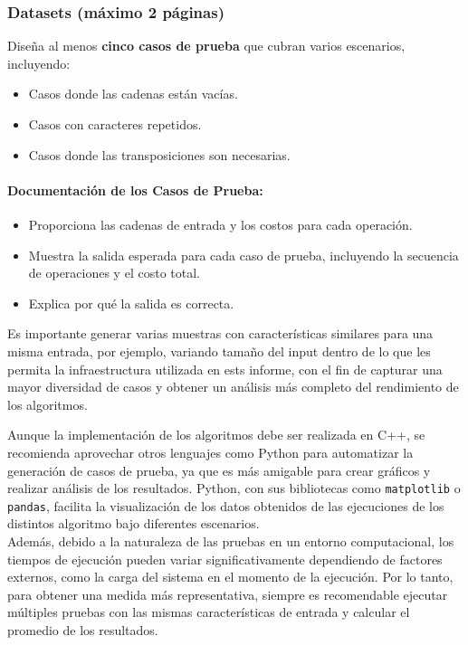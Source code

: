 \subsubsection{Datasets (máximo 2 páginas)}

Diseña al menos \textbf{cinco casos de prueba} que cubran varios escenarios, incluyendo:
\begin{itemize}
    \item Casos donde las cadenas están vacías.
    \item Casos con caracteres repetidos.
    \item Casos donde las transposiciones son necesarias.
\end{itemize}

\paragraph{Documentación de los Casos de Prueba:}
\begin{itemize}
    \item Proporciona las cadenas de entrada y los costos para cada operación.
    \item Muestra la salida esperada para cada caso de prueba, incluyendo la secuencia de operaciones y el costo total.
    \item Explica por qué la salida es correcta.
\end{itemize}

Es importante generar varias muestras con características similares para una misma entrada, por ejemplo, variando tamaño del input dentro de lo que les permita la infraestructura utilizada en ests informe, con el fin de capturar una mayor diversidad de casos y obtener un análisis más completo del rendimiento de los algoritmos.\\

\begin{mdframed}
    Aunque la implementación de los algoritmos debe ser realizada en C++, se recomienda aprovechar otros lenguajes como Python para automatizar la generación de casos de prueba, ya que es más amigable para crear gráficos y realizar análisis de los resultados. Python, con sus bibliotecas como \texttt{matplotlib} o \texttt{pandas}, facilita la visualización de los datos obtenidos de las ejecuciones de los distintos algoritmo bajo diferentes escenarios.\\
    
    Además, debido a la naturaleza de las pruebas en un entorno computacional, los tiempos de ejecución pueden variar significativamente dependiendo de factores externos, como la carga del sistema en el momento de la ejecución. Por lo tanto, para obtener una medida más representativa, siempre es recomendable ejecutar múltiples pruebas con las mismas características de entrada y calcular el promedio de los resultados.
\end{mdframed}


